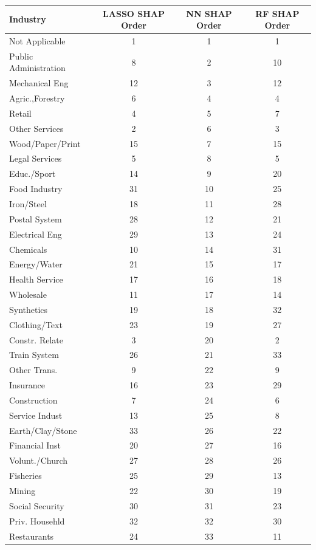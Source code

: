 \begin{tabular}{lccc}
\hline\hline
Industry & LASSO SHAP Order & NN SHAP Order & RF SHAP Order \\
\hline
Not Applicable&1&1&1\\
Public Administration&8&2&10\\
Mechanical Eng&12&3&12\\
Agric.,Forestry&6&4&4\\
Retail&4&5&7\\
Other Services&2&6&3\\
Wood/Paper/Print&15&7&15\\
Legal Services&5&8&5\\
Educ./Sport&14&9&20\\
Food Industry&31&10&25\\
Iron/Steel&18&11&28\\
Postal System&28&12&21\\
Electrical Eng&29&13&24\\
Chemicals&10&14&31\\
Energy/Water&21&15&17\\
Health Service&17&16&18\\
Wholesale&11&17&14\\
Synthetics&19&18&32\\
Clothing/Text&23&19&27\\
Constr. Relate&3&20&2\\
Train System&26&21&33\\
Other Trans.&9&22&9\\
Insurance&16&23&29\\
Construction&7&24&6\\
Service Indust&13&25&8\\
Earth/Clay/Stone&33&26&22\\
Financial Inst&20&27&16\\
Volunt./Church&27&28&26\\
Fisheries&25&29&13\\
Mining&22&30&19\\
Social Security&30&31&23\\
Priv. Househld&32&32&30\\
Restaurants&24&33&11\\
\hline\hline
\end{tabular}
